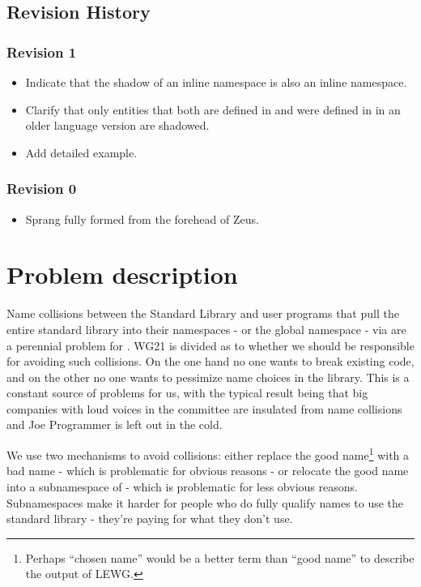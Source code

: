 \section{Revision History}
\subsection{Revision 1}
\begin{itemize}
\item Indicate that the shadow of an inline namespace is also an inline
  namespace.
\item Clarify that only entities that both are defined in  and were
  defined in  in an older language version are shadowed.
\item Add detailed example.
\end{itemize}
\subsection{Revision 0}
\begin{itemize}
\item Sprang fully formed from the forehead of Zeus.
\end{itemize}

\chapter{Problem description}

Name collisions between the Standard Library and user programs that pull the
entire standard library into their namespaces - or the global namespace - via
 are a perennial problem for \Cpp. WG21 is divided
as to whether we should be responsible for avoiding such collisions. On the one
hand no one wants to break existing code, and on the other no one wants to
pessimize name choices in the library. This is a constant source of problems for
us, with the typical result being that big companies with loud voices in the
committee are insulated from name collisions and Joe Programmer is left out in
the cold.

We use two mechanisms to avoid collisions: either replace the good
name\footnote{Perhaps ``chosen name'' would be a better term than ``good name''
to describe the output of LEWG.} with a bad name - which is problematic for
obvious reasons - or relocate the good name into a subnamespace of  -
which is problematic for less obvious reasons. Subnamespaces make it harder for
people who do fully qualify names to use the standard library - they're paying
for what they don't use.

